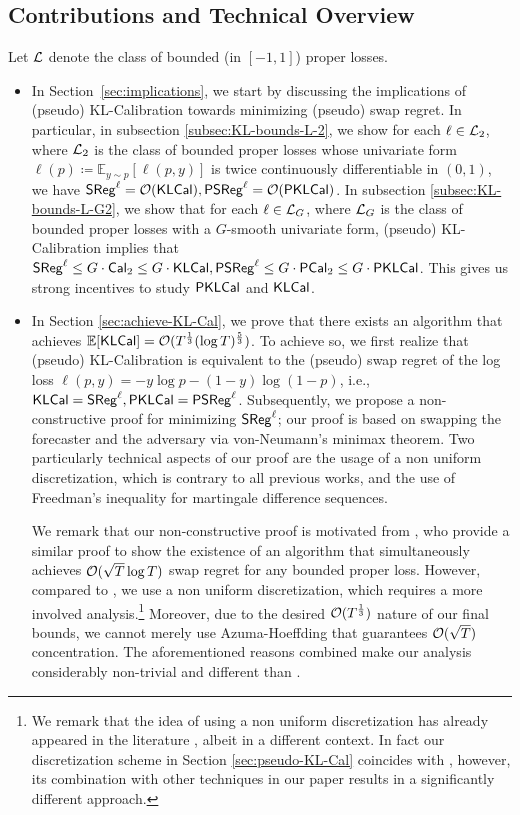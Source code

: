 \subsection{Contributions and Technical Overview}
Let $\mathcal{L}$ denote the class of bounded (in $[-1, 1]$) proper losses. 
\begin{itemize}[leftmargin=*]
\item In Section~\ref{sec:implications}, we start by discussing the implications of (pseudo) KL-Calibration towards minimizing (pseudo) swap regret. In particular, in subsection \ref{subsec:KL-bounds-L-2}, we show for each $\ell \in \mathcal{L}_{2}$, where $\mathcal{L}_{2}$ is the class of bounded proper losses whose univariate form $\ell(p) \coloneqq \mathbb{E}_{y \sim p}[\ell(p, y)]$ 
is twice continuously differentiable in $(0, 1)$, we have $\mathsf{SReg}^{\ell} = \mathcal{O}(\mathsf{KLCal}), \mathsf{PSReg}^{\ell} = \mathcal{O}(\mathsf{PKLCal})$. In subsection \ref{subsec:KL-bounds-L-G2}, we show that for each $\ell \in \mathcal{L}_{G}$, where $\mathcal{L}_{G}$ is the class of bounded proper losses with a $G$-smooth univariate form,
(pseudo) KL-Calibration implies that $\mathsf{SReg}^{\ell} \le G \cdot \mathsf{Cal}_{2} \le G \cdot \mathsf{KLCal}, \mathsf{PSReg}^{\ell} \le G \cdot \mathsf{PCal}_{2} \le G \cdot \mathsf{PKLCal}$. 
This gives us strong incentives to study $\mathsf{PKLCal}$ and $\mathsf{KLCal}$.

\item In Section \ref{sec:achieve-KL-Cal}, we prove that there exists an algorithm that achieves $\mathbb{E}[\mathsf{KLCal}] = \mathcal{O}(T^{\frac{1}{3}} (\log T) ^ {\frac{5}{3}})$. To achieve so, we first realize that (pseudo) KL-Calibration is equivalent to the (pseudo) swap regret of the log loss $\ell(p, y) = -y \log p - (1 - y) \log (1 - p)$, i.e., $\mathsf{KLCal} = \mathsf{SReg}^{\ell}, \mathsf{PKLCal} = \mathsf{PSReg}^{\ell}$. Subsequently, we propose a non-constructive proof for minimizing $\mathsf{SReg}^{\ell}$; our proof is based on swapping the forecaster and the adversary via von-Neumann's minimax theorem. Two particularly technical aspects of our proof are the usage of a non uniform discretization, which is contrary to all previous works, and the use of Freedman's inequality for martingale difference sequences. 

We remark that our non-constructive proof is motivated from \cite{hu2024predict}, who provide a similar proof to show the existence of an algorithm that simultaneously achieves $\mathcal{O}(\sqrt{T} \log T)$ swap regret for any bounded proper loss. However, compared to \cite{hu2024predict}, we use a non uniform discretization, which requires a more involved analysis.\footnote{We remark that the idea of using a non uniform discretization has already appeared in the literature \citep{kotlowski2016online}, albeit in a different context. In fact our discretization scheme in Section \ref{sec:pseudo-KL-Cal} coincides with \cite{kotlowski2016online}, however, its combination with other techniques in our paper results in a significantly different approach. 
}
Moreover, due to the desired $\mathcal{O}(T^{\frac{1}{3}})$ nature of our final bounds, we cannot merely use Azuma-Hoeffding 
that guarantees $\mathcal{O}(\sqrt{T})$ concentration. The aforementioned reasons combined make our analysis considerably non-trivial and different than \cite{hu2024predict}. 


\end{itemize}
